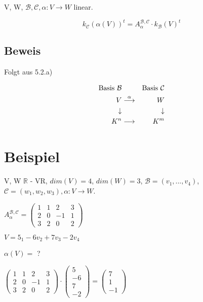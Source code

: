 \documentclass[a4paper, openany]{book}
\begin{document}
        V, W, $\mathcal{B}, \mathcal{C}, \alpha : V \rightarrow W$ linear.

        \begin{equation}
          k_{\mathcal{C}}(\alpha(V))^t = A_{\mathcal{\alpha}}^{\mathcal{B,C}} \cdot k_{\mathcal{B}}(V)^t
        \end{equation}

        \subsection{Beweis}

        Folgt aus 5.2.a)

        \begin{align*}
          \textnormal{Basis } \mathcal{B} & & \textnormal{Basis } \mathcal{C} \\
          V & \overset{\alpha}{\longrightarrow} & W \\
          \downarrow & & \downarrow \\
          K^n & \longrightarrow & K^m
        \end{align*}

        \section{Beispiel}

        V, W $\mathbb{R}$ - VR, $dim(V) = 4$, $dim(W) = 3$, $\mathcal{B} = (v_1, ..., v_4)$, $\mathcal{C} = (w_1, w_2, w_3), \alpha : V \rightarrow W$.

        \begin{center}
          $A_{\alpha}^{\mathcal{B, C}} = \begin{pmatrix}1 & 1 & 2 & 3 \\ 2 & 0 & -1 & 1 \\ 3 & 2 & 0 & 2 \end{pmatrix}$
        \end{center}

        $V = 5_1 - 6v_2 + 7v_3 - 2v_4$

        $\alpha(V) =$ ?

        \par \medskip

        $\begin{pmatrix}1 & 1 & 2 & 3 \\ 2 & 0 & -1 & 1 \\ 3& 2 & 0 & 2 \end{pmatrix} \cdot \begin{pmatrix}5 \\ -6 \\ 7 \\ -2 \end{pmatrix} = \begin{pmatrix}7 \\ 1 \\ -1 \end{pmatrix}$
\end{document}
